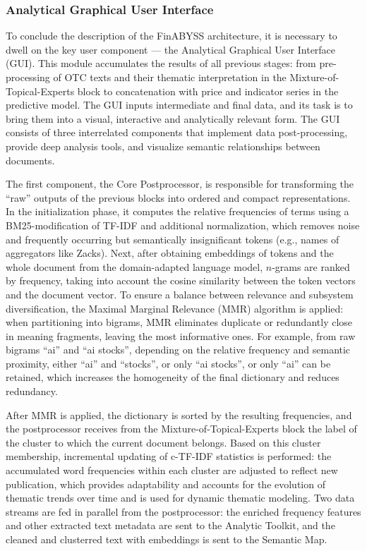 \subsubsection{Analytical Graphical User Interface}
To conclude the description of the FinABYSS architecture, it is necessary to dwell on the key user
component --- the Analytical Graphical User Interface (GUI). This module accumulates the results
of all previous stages: from pre-processing of OTC texts and their thematic interpretation in
the Mixture-of-Topical-Experts block to concatenation with price and indicator series in the predictive
model. The GUI inputs intermediate and final data, and its task is to bring them into a visual, interactive
and analytically relevant form. The GUI consists of three interrelated components that implement data
post-processing, provide deep analysis tools, and visualize semantic relationships between documents.

The first component, the Core Postprocessor, is responsible for transforming the “raw” outputs
of the previous blocks into ordered and compact representations. In the initialization phase, it computes
the relative frequencies of terms using a BM25-modification of TF-IDF and additional normalization, which
removes noise and frequently occurring but semantically insignificant tokens (e.g., names of aggregators
like Zacks). Next, after obtaining embeddings of tokens and the whole document from the domain-adapted
language model, $n$-grams are ranked by frequency, taking into account the cosine similarity between
the token vectors and the document vector. To ensure a balance between relevance and subsystem
diversification, the Maximal Marginal Relevance (MMR) algorithm is applied: when partitioning into bigrams,
MMR eliminates duplicate or redundantly close in meaning fragments, leaving the most informative ones. For
example, from raw bigrams “ai” and “ai stocks”, depending on the relative frequency and semantic proximity,
either “ai” and “stocks”, or only “ai stocks”, or only “ai” can be retained, which increases the homogeneity
of the final dictionary and reduces redundancy.

After MMR is applied, the dictionary is sorted by the resulting frequencies, and the postprocessor receives
from the Mixture-of-Topical-Experts block the label of the cluster to which the current document belongs.
Based on this cluster membership, incremental updating of c-TF-IDF statistics is performed: the accumulated
word frequencies within each cluster are adjusted to reflect new publication, which provides adaptability
and accounts for the evolution of thematic trends over time and is used for dynamic thematic modeling. Two
data streams are fed in parallel from the postprocessor: the enriched frequency features and other extracted
text metadata are sent to the Analytic Toolkit, and the cleaned and clusterred text with embeddings is sent
to the Semantic Map.

